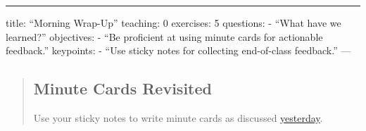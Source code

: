 \begin{center}
\rule{3in}{0.4pt}
\end{center}
title: ``Morning Wrap-Up''
teaching: 0
exercises: 5
questions:
- ``What have we learned?''
objectives:
- ``Be proficient at using minute cards for actionable feedback.''
keypoints:
- ``Use sticky notes for collecting end-of-class feedback.''
---

\begin{quotation}   %
\subsection*{Minute Cards Revisited}

Use your sticky notes to write minute cards
as discussed \href{\{\{ page.root \}\}/06-summarize/}{yesterday}.
\end{quotation}   %
